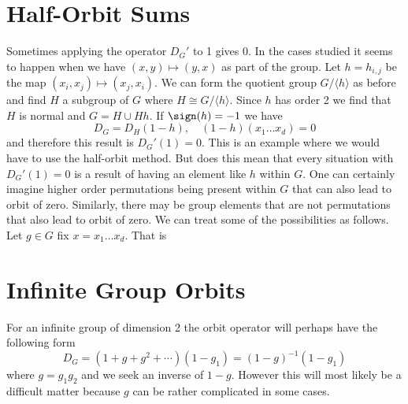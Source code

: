\section{Half-Orbit Sums}

Sometimes applying the operator $D_G'$ to 1 gives 0. In the cases studied it seems to happen when we have $(x,y) \mapsto (y,x)$ as part of the group. Let $h = h_{i,j}$ be the map $(x_i,x_j) \mapsto (x_j,x_i)$. We can form the quotient group $G/\langle h\rangle$ as before and find $H$ a subgroup of $G$ where $H \cong G/\langle h\rangle$. Since $h$ has order 2 we find that $H$ is normal and $G = H \cup Hh$. If $\sign(h) = -1$ we have
\[
	D_G = D_H (1-h),\quad (1-h)(x_1\ldots x_d) = 0
\]
and therefore this result is $D_G'(1) = 0$. This is an example where we would have to use the half-orbit method. But does this mean that every situation with $D_G'(1) = 0$ is a result of having an element like $h$ within $G$. One can certainly imagine higher order permutations being present within $G$ that can also lead to orbit of zero. Similarly, there may be group elements that are not permutations that also lead to orbit of zero. We can treat some of the possibilities as follows. Let $g\in G$ fix $x = x_1\ldots x_d$. That is 

\section{Infinite Group Orbits}

For an infinite group of dimension 2 the orbit operator will perhaps have the following form
\[
	D_G = (1+g+g^2+\cdots )(1-g_1) = (1-g)^{-1}(1-g_1)
\]
where $ g = g_1 g_2$ and we seek an inverse of $1-g$. However this will most likely be a difficult matter because $g$ can be rather complicated in some cases.
\endinput
